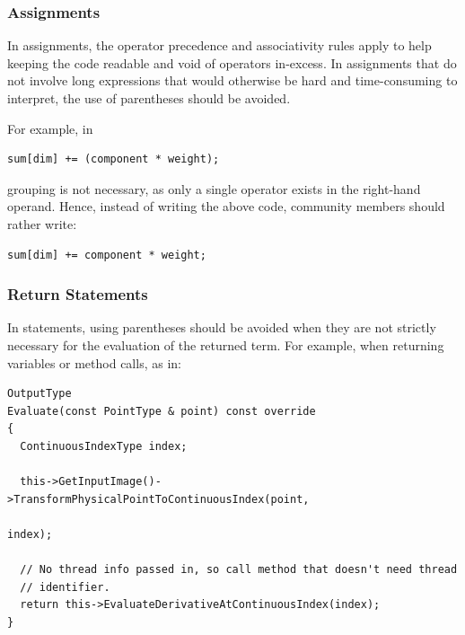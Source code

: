 \subsubsection{Assignments}%
\label{subsubsec:Assignments}

In assignments, the operator precedence and associativity rules apply to help
keeping the code readable and void of operators in-excess. In assignments that
do not involve long expressions that would otherwise be hard and time-consuming
to interpret, the use of parentheses should be avoided.

For example, in

\small
\begin{verbatim}
sum[dim] += (component * weight);
\end{verbatim}
\normalsize

grouping is not necessary, as only a single operator exists in the right-hand
operand. Hence, instead of writing the above code, community members should
rather write:

\small
\begin{verbatim}
sum[dim] += component * weight;
\end{verbatim}
\normalsize


\subsubsection{Return Statements}%
\label{subsubsec:ReturnStatements}

In  statements, using parentheses should be avoided when they
are not strictly necessary for the evaluation of the returned term. For example,
when returning variables or method calls, as in:

\small
\begin{verbatim}
OutputType
Evaluate(const PointType & point) const override
{
  ContinuousIndexType index;

  this->GetInputImage()->TransformPhysicalPointToContinuousIndex(point,
                                                                 index);

  // No thread info passed in, so call method that doesn't need thread
  // identifier.
  return this->EvaluateDerivativeAtContinuousIndex(index);
}
\end{verbatim}
\normalsize

